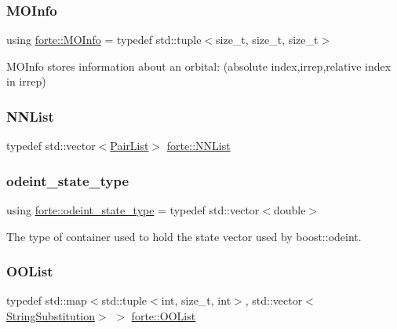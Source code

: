 \subsubsection{\texorpdfstring{M\+O\+Info}{MOInfo}}
{\footnotesize\ttfamily using \mbox{\hyperlink{namespaceforte_aba0d18f1ff36b478ecf2db631246e120}{forte\+::\+M\+O\+Info}} = typedef std\+::tuple$<$size\+\_\+t, size\+\_\+t, size\+\_\+t$>$}

M\+O\+Info stores information about an orbital\+: (absolute index,irrep,relative index in irrep) \mbox{\label{namespaceforte_a5bff522f8c16d63f7b9d500362f6ed28}} 
\subsubsection{\texorpdfstring{N\+N\+List}{NNList}}
{\footnotesize\ttfamily typedef std\+::vector$<$\mbox{\hyperlink{namespaceforte_a3aa026a4f915fc1877b007cc1aab0e3b}{Pair\+List}}$>$ \mbox{\hyperlink{namespaceforte_a5bff522f8c16d63f7b9d500362f6ed28}{forte\+::\+N\+N\+List}}}

\mbox{\label{namespaceforte_ad8fa2d4b40cee55f959c09c9be68a63e}} 
\subsubsection{\texorpdfstring{odeint\+\_\+state\+\_\+type}{odeint\_state\_type}}
{\footnotesize\ttfamily using \mbox{\hyperlink{namespaceforte_ad8fa2d4b40cee55f959c09c9be68a63e}{forte\+::odeint\+\_\+state\+\_\+type}} = typedef std\+::vector$<$double$>$}



The type of container used to hold the state vector used by boost\+::odeint. 

\mbox{\label{namespaceforte_a2b4fd5e252f6e15214db23a259203983}} 
\subsubsection{\texorpdfstring{O\+O\+List}{OOList}}
{\footnotesize\ttfamily typedef std\+::map$<$std\+::tuple$<$int, size\+\_\+t, int$>$, std\+::vector$<$\mbox{\hyperlink{structforte_1_1_string_substitution}{String\+Substitution}}$>$ $>$ \mbox{\hyperlink{namespaceforte_a2b4fd5e252f6e15214db23a259203983}{forte\+::\+O\+O\+List}}}

